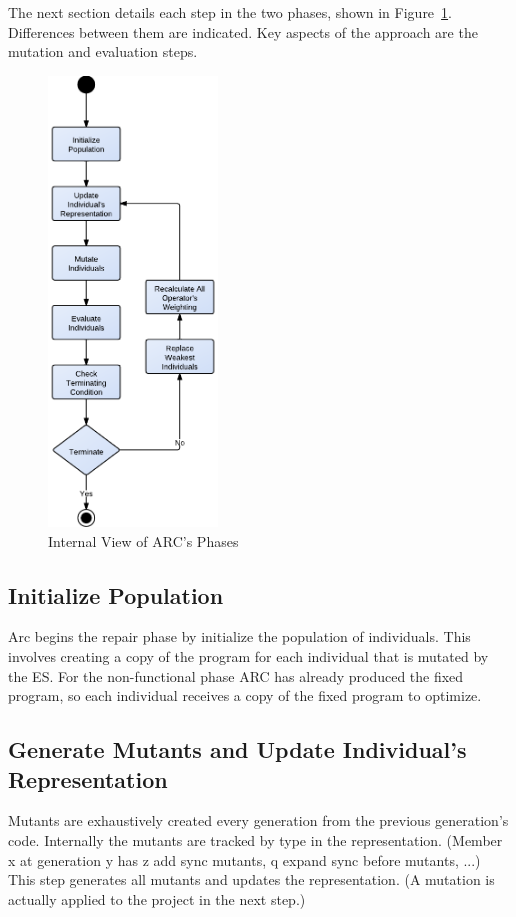 \documentclass[10pt, conference, compsocconf]{IEEEtran}
\begin{document}
The next section details each step in the two phases, shown in Figure~\ref{fig:phases_internals}. Differences between them are indicated.  Key aspects of the approach are the mutation and evaluation steps.

\begin{figure}[!h]
  \centering
  \includegraphics[width=4.50cm]{figures/phases.pdf}
  \caption{Internal View of ARC's Phases}
  \label{fig:phases_internals}
\end{figure}

\subsection{Initialize Population}
\label{sec:initialize_population}

Arc begins the repair phase by initialize the population of individuals.
This involves creating a copy of the program for each individual that is
mutated by the ES. For the non-functional phase ARC has already produced
the fixed program, so each individual receives a copy of the fixed
program to optimize.

\subsection{Generate Mutants and Update Individual's Representation}
\label{sec:update_individual_representation}

Mutants are exhaustively created every generation from the previous generation's code. Internally the mutants are tracked by type in the representation.  (Member x at generation y has z add sync mutants, q expand sync before mutants, ...) This step generates all mutants and updates the representation. (A mutation is actually applied to the project in the next step.)
\end{document}
